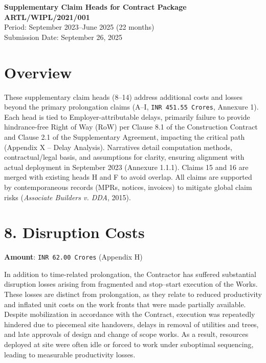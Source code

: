 \documentclass[12pt,letterpaper]{article}
\begin{document}
	
	\begin{center}
		\textbf{Supplementary Claim Heads for Contract Package ARTL/WIPL/2021/001} \\
		Period: September 2023--June 2025 (22 months) \\
		Submission Date: September 26, 2025
	\end{center}
	
	\section*{Overview}
	These supplementary claim heads (8--14) address additional costs and losses beyond the primary prolongation claims (A--I, \texttt{INR 451.55 Crores}, Annexure 1). Each head is tied to Employer-attributable delays, primarily failure to provide hindrance-free Right of Way (RoW) per Clause 8.1 of the Construction Contract and Clause 2.1 of the Supplementary Agreement, impacting the critical path (Appendix X -- Delay Analysis). Narratives detail computation methods, contractual/legal basis, and assumptions for clarity, ensuring alignment with actual deployment in September 2023 (Annexure 1.1.1). Claims 15 and 16 are merged with existing heads H and F to avoid overlap. All claims are supported by contemporaneous records (MPRs, notices, invoices) to mitigate global claim risks (\textit{Associate Builders v. DDA}, 2015).
	
	\section*{8. Disruption Costs}
	\textbf{Amount}: \texttt{INR 62.00 Crores} (Appendix H)
	
	In addition to time-related prolongation, the Contractor has suffered substantial disruption losses arising from fragmented and stop--start execution of the Works. These losses are distinct from prolongation, as they relate to reduced productivity and inflated unit costs on the work fronts that were made partially available. Despite mobilization in accordance with the Contract, execution was repeatedly hindered due to piecemeal site handovers, delays in removal of utilities and trees, and late approvals of design and change of scope works. As a result, resources deployed at site were often idle or forced to work under suboptimal sequencing, leading to measurable productivity losses.
	
\end{document}

